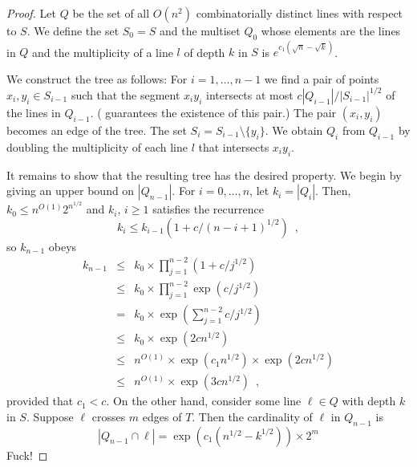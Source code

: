 \documentclass[lotsofwhite]{patmorin}
\begin{document}
\begin{proof}

Let $Q$ be the set of all $O(n^2)$ combinatorially distinct lines with
respect to $S$.  We define the set $S_0=S$ and the multiset $Q_0$
whose elements are the lines in $Q$ and the multiplicity of a line $l$
of depth $k$ in $S$ is $e^{c_1(\sqrt{n}-\sqrt{k})}$.

We construct the tree as follows: For $i=1,\ldots,n-1$ we find a pair
of points $x_i,y_i\in S_{i-1}$ such that the segment $x_iy_i$
intersects at most $c|Q_{i-1}|/|S_{i-1}|^{1/2}$ of the lines in
$Q_{i-1}$. ( guarantees the existence of this pair.)  The
pair $(x_i,y_i)$ becomes an edge of the tree.  The set
$S_i=S_{i-1}\setminus\{y_i\}$.  We obtain $Q_i$ from $Q_{i-1}$ by
doubling the multiplicity of each line $l$ that intersects $x_iy_i$.

It remains to show that the resulting tree has the desired property.
We begin by giving an upper bound on $|Q_{n-1}|$. For $i=0,\ldots,n$,
let $k_i=|Q_i|$.  Then, $k_0\le n^{O(1)}2^{n^{1/2}}$ and $k_i$, $i\ge
1$ satisfies the recurrence
\[
     k_i \le k_{i-1}(1+c/(n-i+1)^{1/2}) \enspace ,
\]
so $k_{n-1}$ obeys
\begin{eqnarray*}
     k_{n-1} 
      & \le & k_0\times\prod_{j=1}^{n-2}\left(1+c/j^{1/2}\right) \\ 
      & \le & k_0\times\prod_{j=1}^{n-2}\exp\left(c/j^{1/2}\right) \\
      &  =  & k_0\times\exp\left(\sum_{j=1}^{n-2} c/j^{1/2}\right) \\
      & \le & k_0\times\exp\left(2cn^{1/2}\right) \\
      & \le & n^{O(1)}\times\exp\left(c_1n^{1/2}\right)
                  \times\exp\left(2cn^{1/2}\right) \\
      & \le & n^{O(1)}\times\exp\left(3cn^{1/2}\right) \enspace ,
\end{eqnarray*}
provided that $c_1< c$.  On the other hand, consider some line $\ell\in
Q$ with depth $k$ in $S$.  Suppose $\ell$ crosses $m$ edges of $T$.  Then the cardinality of $\ell$ in $Q_{n-1}$ is 
\[
   |Q_{n-1}\cap \ell| = \exp\left(c_1\left(n^{1/2}-k^{1/2}\right)\right)
     \times 2^{m}
\]
Fuck!
\end{proof}
\end{document}

